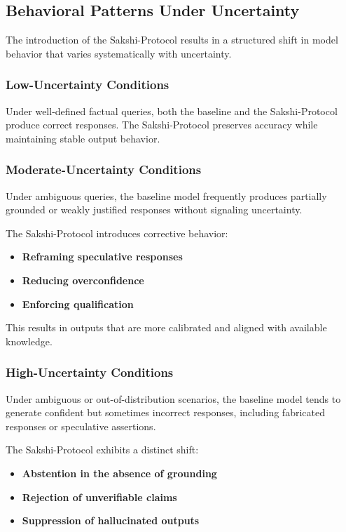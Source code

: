 \documentclass[12pt,a4paper]{article}
\begin{document}
\subsection{Behavioral Patterns Under Uncertainty}
The introduction of the Sakshi-Protocol results in a structured shift in model behavior that varies systematically with uncertainty.

\subsubsection*{Low-Uncertainty Conditions}
Under well-defined factual queries, both the baseline and the Sakshi-Protocol produce correct responses. The Sakshi-Protocol preserves accuracy while maintaining stable output behavior.

\subsubsection*{Moderate-Uncertainty Conditions}
Under ambiguous queries, the baseline model frequently produces partially grounded or weakly justified responses without signaling uncertainty.

The Sakshi-Protocol introduces corrective behavior:
\begin{itemize}
    \item \textbf{Reframing speculative responses}
    \item \textbf{Reducing overconfidence}
    \item \textbf{Enforcing qualification}
\end{itemize}

This results in outputs that are more calibrated and aligned with available knowledge.

\subsubsection*{High-Uncertainty Conditions}
Under ambiguous or out-of-distribution scenarios, the baseline model tends to generate confident but sometimes incorrect responses, including fabricated responses or speculative assertions.

The Sakshi-Protocol exhibits a distinct shift:
\begin{itemize}
    \item \textbf{Abstention in the absence of grounding}
    \item \textbf{Rejection of unverifiable claims}
    \item \textbf{Suppression of hallucinated outputs}
\end{itemize}
\end{document}
